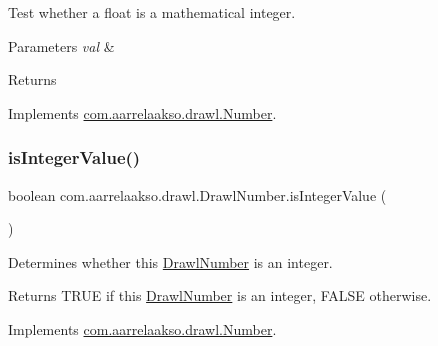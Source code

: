 Test whether a float is a mathematical integer. 


\begin{DoxyParams}{Parameters}
{\em val} & \\
\hline
\end{DoxyParams}
\begin{DoxyReturn}{Returns}

\end{DoxyReturn}


Implements \hyperlink{interfacecom_1_1aarrelaakso_1_1drawl_1_1_number_a731dbb91dcfd46319662f57c26fcf06a}{com.\+aarrelaakso.\+drawl.\+Number}.

\mbox{\label{classcom_1_1aarrelaakso_1_1drawl_1_1_drawl_number_a520419e41b314adf719cfcd5939dee01}} 
\subsubsection{\texorpdfstring{is\+Integer\+Value()}{isIntegerValue()}\hspace{0.1cm}{\footnotesize\ttfamily [3/3]}}
{\footnotesize\ttfamily boolean com.\+aarrelaakso.\+drawl.\+Drawl\+Number.\+is\+Integer\+Value (\begin{DoxyParamCaption}{ }\end{DoxyParamCaption})}



Determines whether this \hyperlink{classcom_1_1aarrelaakso_1_1drawl_1_1_drawl_number}{Drawl\+Number} is an integer. 

\begin{DoxyReturn}{Returns}
{\ttfamily T\+R\+UE} if this \hyperlink{classcom_1_1aarrelaakso_1_1drawl_1_1_drawl_number}{Drawl\+Number} is an integer, {\ttfamily F\+A\+L\+SE} otherwise. 
\end{DoxyReturn}


Implements \hyperlink{interfacecom_1_1aarrelaakso_1_1drawl_1_1_number_a33d0b6d8f3aeb0ccb9f710739c80f6e7}{com.\+aarrelaakso.\+drawl.\+Number}.

\mbox{\label{classcom_1_1aarrelaakso_1_1drawl_1_1_drawl_number_a6b5501320af37fd5aa623ed4bcbbd104}} 
